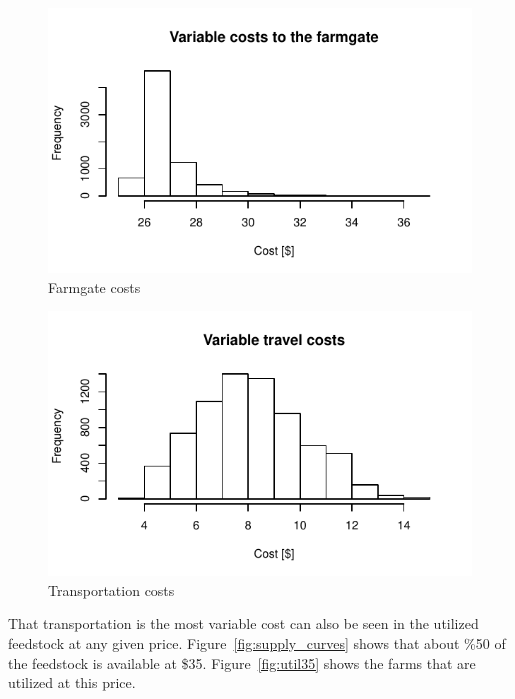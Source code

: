 \documentclass{elsart}
\begin{document}
\begin{figure}[hpt]
  \centering
\includegraphics[width=1.0\textwidth]{farmgate.pdf}
  \caption{Farmgate costs  }
  \label{fig:farmgate_hist}
\end{figure}

\begin{figure}[hpt]
  \centering
\includegraphics[width=1.0\textwidth]{road_hist.pdf}
  \caption{Transportation costs  }
  \label{fig:transportation_hist}
\end{figure}

That transportation is the most variable cost can also be seen in the
utilized feedstock at any given price.  Figure~\ref{fig:supply_curves}
shows that about \%50 of the feedstock is available at \$35.
Figure~\ref{fig:util35} shows the farms that are utilized at this
price.
\end{document}
